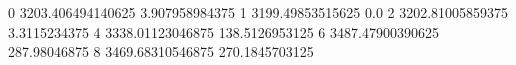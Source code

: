 0 3203.406494140625 3.907958984375
1 3199.49853515625 0.0
2 3202.81005859375 3.3115234375
4 3338.01123046875 138.5126953125
6 3487.47900390625 287.98046875
8 3469.68310546875 270.1845703125
